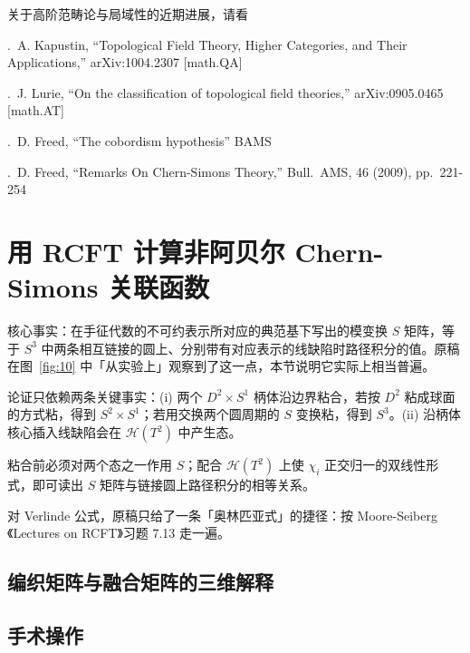 关于高阶范畴论与局域性的近期进展，请看

.\ A. Kapustin, ``Topological Field Theory, Higher Categories, and Their Applications,'' arXiv:1004.2307 [math.QA]

.\ J. Lurie, ``On the classification of topological field theories,'' arXiv:0905.0465 [math.AT]

.\ D. Freed, ``The cobordism hypothesis'' BAMS

.\ D. Freed, ``Remarks On Chern-Simons Theory,'' Bull.\ AMS, 46 (2009), pp.\ 221-254

\section{用 RCFT 计算非阿贝尔 Chern-Simons 关联函数} %

\begin{keytakeaways}
  \item 核心事实：在手征代数的不可约表示所对应的典范基下写出的模变换 $S$ 矩阵，等于 $S^3$ 中两条相互链接的圆上、分别带有对应表示的线缺陷时路径积分的值。原稿在图~\ref{fig:10} 中「从实验上」观察到了这一点，本节说明它实际上相当普遍。
  \item 论证只依赖两条关键事实：(i) 两个 $D^2\times S^1$ 柄体沿边界粘合，若按 $D^2$ 粘成球面的方式粘，得到 $S^2\times S^1$；若用交换两个圆周期的 $S$ 变换粘，得到 $S^3$。(ii) 沿柄体核心插入线缺陷会在 $\mathcal{H}(T^2)$ 中产生态。
  \item 粘合前必须对两个态之一作用 $S$；配合 $\mathcal{H}(T^2)$ 上使 $\chi_i$ 正交归一的双线性形式，即可读出 $S$ 矩阵与链接圆上路径积分的相等关系。
  \item 对 Verlinde 公式，原稿只给了一条「奥林匹亚式」的捷径：按 Moore-Seiberg《Lectures on RCFT》习题 7.13 走一遍。
\end{keytakeaways}

\subsection{编织矩阵与融合矩阵的三维解释} %

\subsection{手术操作} %

